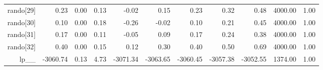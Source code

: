 \begin{table}[ht]
\begin{tabular}{rrrrrrrrrrr}
  rando[29] & 0.23 & 0.00 & 0.13 & -0.02 & 0.15 & 0.23 & 0.32 & 0.48 & 4000.00 & 1.00 \\ 
  rando[30] & 0.10 & 0.00 & 0.18 & -0.26 & -0.02 & 0.10 & 0.21 & 0.45 & 4000.00 & 1.00 \\ 
  rando[31] & 0.17 & 0.00 & 0.11 & -0.05 & 0.09 & 0.17 & 0.24 & 0.38 & 4000.00 & 1.00 \\ 
  rando[32] & 0.40 & 0.00 & 0.15 & 0.12 & 0.30 & 0.40 & 0.50 & 0.69 & 4000.00 & 1.00 \\ 
  lp\_\_ & -3060.74 & 0.13 & 4.73 & -3071.34 & -3063.65 & -3060.45 & -3057.38 & -3052.55 & 1374.00 & 1.00 \\ 
   \hline
\end{tabular}
\label{efit_tab}
\end{table}
